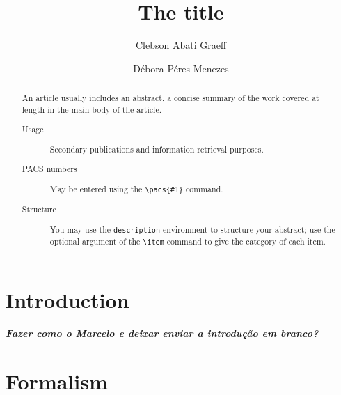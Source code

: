 \documentclass[prc, reprint, amsmath, linenumbers,10pt]{revtex4-1}
\newcommand{\comment}[1]{{\bf\textit{#1}}}
\begin{document}

%
%

\title{The title}

\author{Clebson Abati Graeff}

\author{Débora Péres Menezes}


\begin{abstract}
An article usually includes an abstract, a concise summary of the work
covered at length in the main body of the article. 
\begin{description}
\item[Usage]
Secondary publications and information retrieval purposes.
\item[PACS numbers]
May be entered using the \verb+\pacs{#1}+ command.
\item[Structure]
You may use the \texttt{description} environment to structure your abstract;
use the optional argument of the \verb+\item+ command to give the category of each item. 
\end{description}
\end{abstract}




\maketitle

%
%

\section{Introduction}

\comment{Fazer como o Marcelo e deixar enviar a introdução em branco?}

\section{Formalism}
\end{document}
